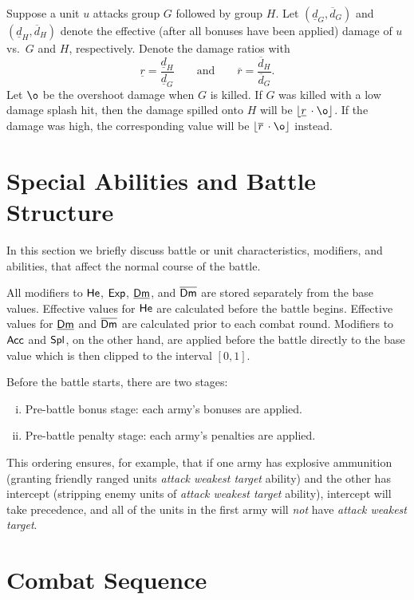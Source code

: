 \documentclass{article}
\newcommand{\floor}[1]{\left\lfloor #1 \right\rfloor}
\DeclareMathOperator{\He}{{\sf He}} %
\DeclareMathOperator{\DLow}{\underline{\sf Dm}} %
\DeclareMathOperator{\DHigh}{\overline{\sf Dm}} %
\DeclareMathOperator{\Acc}{{\sf Acc}} %
\DeclareMathOperator{\Spl}{{\sf Spl}} %
\DeclareMathOperator{\Exp}{{\sf Exp}} %
\numberwithin{equation}{section}
\begin{document}
Suppose a unit $u$ attacks group $G$ followed by group $H$. Let $(\underline{d}_G, \overline{d}_G)$ and $(\underline{d}_H, \overline{d}_H)$ denote the effective (after all bonuses have been applied) damage of $u$ vs.\ $G$ and $H$, respectively.
Denote the damage ratios with
\[
    \underline{r} = \frac{\underline{d}_H}{\underline{d}_G}
    \qquad \text{and} \qquad
    \overline{r} = \frac{\overline{d}_H}{\overline{d}_G}.
\]
Let $\o $ be the overshoot damage when $G$ is killed. If $G$ was killed with a low damage splash hit, then the damage spilled onto $H$ will be $\floor{\underline{r} \, \cdot \o }$. If the damage was high, the corresponding value will be $\floor{\overline{r} \, \cdot \o }$ instead.


\section{Special Abilities and Battle Structure}
In this section we briefly discuss battle or unit characteristics, modifiers, and abilities, that affect the normal course of the battle.

All modifiers to $\He $, $\Exp $, $\DLow $, and $\DHigh $ are stored separately from the base values. Effective values for $\He $ are calculated before the battle begins. Effective values for $\DLow $ and $\DHigh $ are calculated prior to each combat round.
Modifiers to $\Acc $ and $\Spl $, on the other hand, are applied before the battle directly to the base value which is then clipped to the interval $[0, 1]$.

Before the battle starts, there are two stages:
\begin{enumerate}[(i)]
    \item Pre-battle bonus stage: each army's bonuses are applied.
    \item Pre-battle penalty stage: each army's penalties are applied.
\end{enumerate}
This ordering ensures, for example, that if one army has explosive ammunition (granting friendly ranged units \emph{attack weakest target} ability) and the other has intercept (stripping enemy units of \emph{attack weakest target} ability), intercept will take precedence, and all of the units in the first army will \emph{not} have \emph{attack weakest target}.


\section{Combat Sequence}
\end{document}
